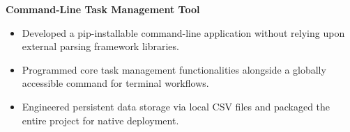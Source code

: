 \documentclass[10pt,a4paper]{article}
\begin{document}
\noindent\textbf{Command-Line Task Management Tool}\hfill{}\vspace{-0.5em}
\begin{itemize}[leftmargin=*]
\setlength\itemsep{0pt}
\setlength\parskip{0pt}
\setlength\parfillskip{0pt}
\item Developed a pip-installable command-line application without relying upon external parsing framework libraries.
\item Programmed core task management functionalities alongside a globally accessible command for terminal workflows.
\item Engineered persistent data storage via local CSV files and packaged the entire project for native deployment.
\end{itemize}
\end{document}
